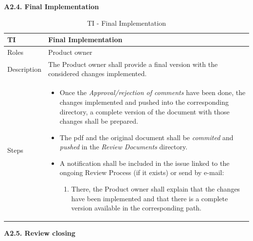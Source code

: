 \documentclass{template/openetcs_article}
\begin{document}
\textbf{A2.4. Final Implementation}

\begin{table}[H]
\begin{tabular}{|m{2cm}|m{12cm}|}
\hline
\rowcolor{myblue}
TI & 
Final Implementation
\\\hline
Roles &
Product owner
\\\hline
Description &
The Product owner shall provide a final version with the considered changes implemented.  
\\\hline
Steps &
\begin{itemize}
\item Once the {\it Approval/rejection of comments} have been done, the changes implemented and pushed into the corresponding directory, a complete version of the document with those changes shall be prepared.
\item The pdf and the original document shall be {\it commited} and {\it pushed} in the {\it Review Documents} directory.
\item A notification shall be included in the issue linked to the ongoing Review Process (if it exists) or send by e-mail: 
\begin{enumerate}
\item There, the Product owner shall explain that the changes have been implemented and that there is a complete version available in the corresponding path.
\end{enumerate}
\end{itemize}
\\\hline
\end{tabular}
\caption{TI - Final Implementation}
\end{table}

\textbf{A2.5. Review closing}
\end{document}
